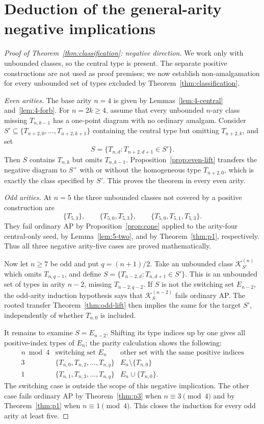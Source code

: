 \documentclass[11pt,a4paper]{article}
\theoremstyle{remark}
\newcommand{\K}{\mathcal K}
\begin{document}
\section{Deduction of the general-arity negative implications}\label{sec:conclusion}
\begin{proof}[Proof of Theorem~\ref{thm:classification}: negative direction]
We work only with unbounded classes, so the central type is present.
The separate positive constructions are not used as proof premises;
we now establish non-amalgamation for every unbounded set of types
excluded by Theorem~\ref{thm:classification}.

\emph{Even arities.}  The base arity $n=4$ is given by
Lemmas~\ref{lem:4-central} and~\ref{lem:4-forb}.
For $n=2k\ge4$, assume that every unbounded $n$-ary class missing
$T_{n,k-1}$ has a one-point diagram with no ordinary amalgam.
Consider $S'\subseteq\{T_{n+2,0},\ldots,T_{n+2,k+1}\}$
containing the central type but omitting $T_{n+2,k}$, and set
\[
 S=\{T_{n,d}:T_{n+2,d+1}\in S'\}.
\]
Then $S$ contains $T_{n,k}$ but omits $T_{n,k-1}$.
Proposition~\ref{prop:even-lift} transfers the negative diagram to
$S^+$ with or without the homogeneous type $T_{n+2,0}$,
which is exactly the class specified by $S'$.
This proves the theorem in every even arity.

\emph{Odd arities.}  At $n=5$ the three unbounded classes not
covered by a positive construction are
\[
 \{T_{5,3}\},\qquad \{T_{5,0},T_{5,3}\},\qquad
 \{T_{5,0},T_{5,1},T_{5,3}\}.
\]
They fail ordinary AP by Proposition~\ref{prop:cone} applied to the
arity-four central-only seed, by Lemma~\ref{lem:5-two}, and by
Theorem~\ref{thm:p1}, respectively.  Thus all three negative
arity-five cases are proved mathematically.

Now let $n\ge7$ be odd and put $q=(n+1)/2$.
Take an unbounded class $\K^{(n)}_{S'}$ which omits $T_{n,q-1}$,
and define $S=\{T_{n-2,d}:T_{n,d+1}\in S'\}$.
This is an unbounded set of types in arity $n-2$, missing
$T_{n-2,q-2}$.  If $S$ is not the switching set $E_{n-2}$,
the odd-arity induction hypothesis says that $\K^{(n-2)}_S$
fails ordinary AP.  The rooted transfer
Theorem~\ref{thm:odd-lift} then implies the same for the target
$S'$, independently of whether $T_{n,0}$ is included.

It remains to examine $S=E_{n-2}$.  Shifting its type indices up by
one gives all positive-index types of $E_n$; the parity calculation
shows the following:
\[
\begin{array}{c|c|c}
 n\bmod4&\text{switching set }E_n&\text{other set with the same positive indices}\\\hline
 3&\{T_{n,0},T_{n,2},\ldots,T_{n,q}\}&
 E_n\setminus\{T_{n,0}\}\\
 1&\{T_{n,1},T_{n,3},\ldots,T_{n,q}\}&
 E_n\cup\{T_{n,0}\}.
\end{array}
\]
The switching case is outside the scope of this negative implication.
The other case fails ordinary AP by Theorem~\ref{thm:p3} when
$n\equiv3\pmod4$ and by Theorem~\ref{thm:p1} when
$n\equiv1\pmod4$.
This closes the induction for every odd arity at least five.
\end{proof}
\end{document}
